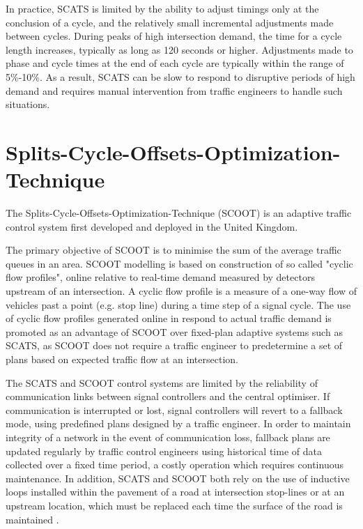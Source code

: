 In practice, SCATS is limited by the ability to adjust timings only at the conclusion of a cycle, and the relatively small incremental adjustments made between cycles. During peaks of high intersection demand, the time for a cycle length increases, typically as long as 120 seconds or higher. Adjustments made to phase and cycle times at the end of each cycle are typically within the range of 5\%-10\%. As a result, SCATS can be slow to respond to disruptive periods of high demand and requires manual intervention from traffic engineers to handle such situations.

\section{Splits-Cycle-Offsets-Optimization-Technique}

The Splits-Cycle-Offsets-Optimization-Technique (SCOOT) is an adaptive traffic control system first developed and deployed in the United Kingdom.

The primary objective of SCOOT is to minimise the sum of the average traffic queues in an area. SCOOT modelling is based on construction of so called "cyclic flow profiles", online relative to real-time demand measured by detectors upstream of an intersection. A cyclic flow profile is a measure of a one-way flow of vehicles past a point (e.g. stop line) during a time step of a signal cycle. The use of cyclic flow profiles generated online in respond to actual traffic demand is promoted as an advantage of SCOOT over fixed-plan adaptive systems such as SCATS, as SCOOT does not require a traffic engineer to predetermine a set of plans based on expected traffic flow at an intersection\cite{bell1992future,robertson1991optimizing}.

The SCATS and SCOOT control systems are limited by the reliability of communication links between signal controllers and the central optimiser. If communication is interrupted or lost, signal controllers will revert to a fallback mode, using predefined plans designed by a traffic engineer. In order to maintain integrity of a network in the event of communication loss, fallback plans are updated regularly by traffic control engineers using historical time of data collected over a fixed time period, a costly operation which requires continuous maintenance. In addition, SCATS and SCOOT both rely on the use of inductive loops installed within the pavement of a road at intersection stop-lines or at an upstream location, which must be replaced each time the surface of the road is maintained  \cite{bell1992future}.

